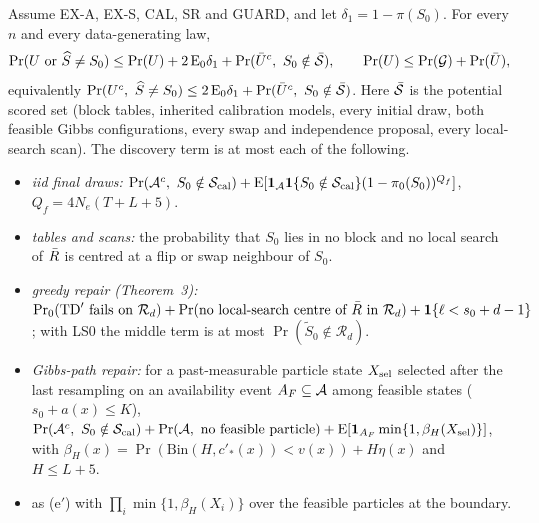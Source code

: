 \begin{theorem}\label{thm:composition}
Assume EX-A, EX-S, CAL, SR and GUARD, and let $\delta_1=1-\pi(S_0)$. For every $n$ and every data-generating law,
\[
\Pr(U\ \text{or}\ \widehat S\ne S_0)\le\Pr(U)+2\,\mathrm E_0\delta_1+\Pr(\bar U^c,\ S_0\notin\bar\cS),
\qquad \Pr(U)\le\Pr(\cG)+\Pr(\bar U),
\]
equivalently $\Pr(U^c,\ \widehat S\ne S_0)\le 2\,\mathrm E_0\delta_1+\Pr(\bar U^c,\ S_0\notin\bar{\mathcal S})$. Here
$\bar{\mathcal S}$ is the potential scored set (block tables, inherited calibration models, every initial draw, both feasible
Gibbs configurations, every swap and independence proposal, every local-search scan). The discovery term is at most
each of the following.
\begin{itemize}
\item[(a)] \emph{iid final draws:}
  $\Pr(\cA^c,\ S_0\notin\cS_{\rm cal})+\mathrm E[\mathbf 1_{\cA}\mathbf 1\{S_0\notin\cS_{\rm cal}\}(1-\pi_0(S_0))^{Q_f}]$,
  $Q_f=4N_e(T+L+5)$.
\item[(d)] \emph{tables and scans:} the probability that $S_0$ lies in no block and no local search of $\bar R$ is
  centred at a flip or swap neighbour of $S_0$.
\item[(d$^+$)] \emph{greedy repair (Theorem~3):}
  $\Pr_0(\mathrm{TD}'\ \text{fails on}\ \mathcal R_d)+\Pr(\text{no local-search centre of}\ \bar R\ \text{in}\ \mathcal
  R_d)+\mathbf 1\{\ell<s_0+d-1\}$; with LS0 the middle term is at most $\Pr(\tilde S_0\notin\mathcal R_d)$.
\item[(e$'$)] \emph{Gibbs-path repair:} for a past-measurable particle state $X_{\rm sel}$ selected after the last
  resampling on an availability event $A_F\subseteq\mathcal A$ among feasible states ($s_0+a(x)\le K$),
  $\Pr(\cA^c,\ S_0\notin\cS_{\rm cal})+\Pr(\cA,\ \text{no feasible particle})+\mathrm E[\mathbf
  1_{A_F}\min\{1,\beta_H(X_{\rm sel})\}]$, with $\beta_H(x)=\Pr(\mathrm{Bin}(H,c'_*(x))<v(x))+H\eta(x)$ and $H\le L+5$.
\item[(e-M)] as (e$'$) with $\prod_{i}\min\{1,\beta_H(X_i)\}$ over the feasible particles at the boundary.
\end{itemize}
\end{theorem}

